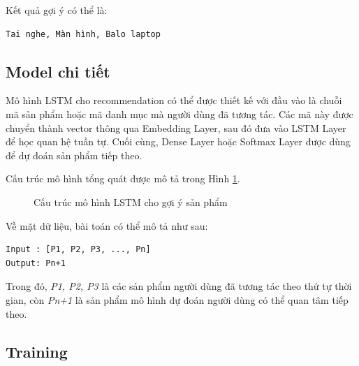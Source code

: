 \documentclass[../main.tex]{subfiles}
\begin{document}
Kết quả gợi ý có thể là:

\begin{verbatim}
Tai nghe, Màn hình, Balo laptop
\end{verbatim}

\subsection{Model chi tiết}

Mô hình LSTM cho recommendation có thể được thiết kế với đầu vào là chuỗi mã sản phẩm hoặc mã danh mục mà người dùng đã tương tác. Các mã này được chuyển thành vector thông qua Embedding Layer, sau đó đưa vào LSTM Layer để học quan hệ tuần tự. Cuối cùng, Dense Layer hoặc Softmax Layer được dùng để dự đoán sản phẩm tiếp theo.

Cấu trúc mô hình tổng quát được mô tả trong Hình \ref{fig:chapter3-lstm-model}.

\begin{figure}[H]
    \centering
    \caption{Cấu trúc mô hình LSTM cho gợi ý sản phẩm}
    \label{fig:chapter3-lstm-model}
\end{figure}

Về mặt dữ liệu, bài toán có thể mô tả như sau:

\begin{verbatim}
Input : [P1, P2, P3, ..., Pn]
Output: Pn+1
\end{verbatim}

Trong đó, \textit{P1, P2, P3} là các sản phẩm người dùng đã tương tác theo thứ tự thời gian, còn \textit{Pn+1} là sản phẩm mô hình dự đoán người dùng có thể quan tâm tiếp theo.

\subsection{Training}
\end{document}
